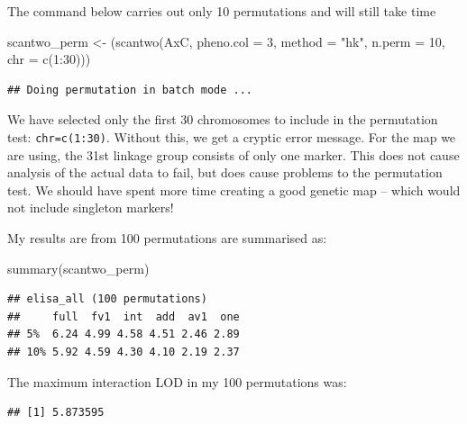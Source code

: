 \documentclass[
]{book}
\newenvironment{Shaded}{\begin{snugshade}}{\end{snugshade}}
\newcommand{\AttributeTok}[1]{\textcolor[rgb]{0.77,0.63,0.00}{#1}}
\newcommand{\DecValTok}[1]{\textcolor[rgb]{0.00,0.00,0.81}{#1}}
\newcommand{\FunctionTok}[1]{\textcolor[rgb]{0.00,0.00,0.00}{#1}}
\newcommand{\NormalTok}[1]{#1}
\newcommand{\OtherTok}[1]{\textcolor[rgb]{0.56,0.35,0.01}{#1}}
\newcommand{\SpecialCharTok}[1]{\textcolor[rgb]{0.00,0.00,0.00}{#1}}
\newcommand{\StringTok}[1]{\textcolor[rgb]{0.31,0.60,0.02}{#1}}
\begin{document}
The command below carries out only 10 permutations and will still take time

\begin{Shaded}
\begin{Highlighting}[]
\NormalTok{scantwo\_perm }\OtherTok{\textless{}{-}}\NormalTok{ (}\FunctionTok{scantwo}\NormalTok{(AxC, }\AttributeTok{pheno.col =} \DecValTok{3}\NormalTok{, }\AttributeTok{method =} \StringTok{"hk"}\NormalTok{, }\AttributeTok{n.perm =} \DecValTok{10}\NormalTok{, }
    \AttributeTok{chr =} \FunctionTok{c}\NormalTok{(}\DecValTok{1}\SpecialCharTok{:}\DecValTok{30}\NormalTok{)))}
\end{Highlighting}
\end{Shaded}

\begin{verbatim}
## Doing permutation in batch mode ...
\end{verbatim}

We have selected only the first 30 chromosomes to include in the permutation test: \texttt{chr=c(1:30)}. Without this, we get a cryptic error message. For the map we are using, the 31st linkage group consists of only one marker. This does not cause analysis of the actual data to fail, but does cause problems to the permutation test. We should have spent more time creating a good genetic map -- which would not include singleton markers!

My results are from 100 permutations are summarised as:

\begin{Shaded}
\begin{Highlighting}[]
\FunctionTok{summary}\NormalTok{(scantwo\_perm)}
\end{Highlighting}
\end{Shaded}

\begin{verbatim}
## elisa_all (100 permutations)
##     full  fv1  int  add  av1  one
## 5%  6.24 4.99 4.58 4.51 2.46 2.89
## 10% 5.92 4.59 4.30 4.10 2.19 2.37
\end{verbatim}

The maximum interaction LOD in my 100 permutations was:

\begin{Shaded}
\end{Shaded}

\begin{verbatim}
## [1] 5.873595
\end{verbatim}
\end{document}
